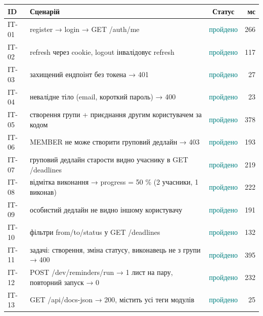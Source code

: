 \begin{longtable}{@{}l L{10.6cm} c r@{}}
\toprule
ID & Сценарій & Статус & мс\\
\midrule\endhead
IT-01 & register → login → GET /auth/me & \textcolor{teal}{пройдено} & 266\\
IT-02 & refresh через cookie, logout інвалідовує refresh & \textcolor{teal}{пройдено} & 117\\
IT-03 & захищений ендпоінт без токена → 401 & \textcolor{teal}{пройдено} & 27\\
IT-04 & невалідне тіло (email, короткий пароль) → 400 & \textcolor{teal}{пройдено} & 23\\
IT-05 & створення групи + приєднання другим користувачем за кодом & \textcolor{teal}{пройдено} & 378\\
IT-06 & MEMBER не може створити груповий дедлайн → 403 & \textcolor{teal}{пройдено} & 193\\
IT-07 & груповий дедлайн старости видно учаснику в GET /deadlines & \textcolor{teal}{пройдено} & 219\\
IT-08 & відмітка виконання → progress = 50 \% (2 учасники, 1 виконав) & \textcolor{teal}{пройдено} & 222\\
IT-09 & особистий дедлайн не видно іншому користувачу & \textcolor{teal}{пройдено} & 191\\
IT-10 & фільтри from/to/status у GET /deadlines & \textcolor{teal}{пройдено} & 132\\
IT-11 & задачі: створення, зміна статусу, виконавець не з групи → 400 & \textcolor{teal}{пройдено} & 395\\
IT-12 & POST /dev/reminders/run → 1 лист на пару, повторний запуск → 0 & \textcolor{teal}{пройдено} & 232\\
IT-13 & GET /api/docs-json → 200, містить усі теги модулів & \textcolor{teal}{пройдено} & 25\\
\bottomrule
\end{longtable}
